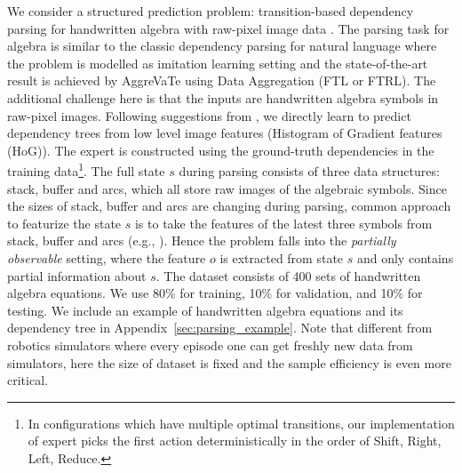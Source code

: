 \documentclass{article}
\begin{document}
We consider a structured prediction problem: transition-based dependency parsing for handwritten algebra with raw-pixel image data \cite{duyckpredicting}. The parsing task for algebra is similar to the classic dependency parsing for natural language \cite{chang2015learning_dependency} where the problem is modelled as imitation learning setting and the state-of-the-art result is achieved by AggreVaTe using Data Aggregation (FTL or FTRL). The additional challenge here is that the inputs are handwritten algebra symbols in raw-pixel images. Following suggestions from \cite{duyckpredicting}, we directly learn to predict dependency trees from low level image features (Histogram of Gradient features (HoG)). The expert is constructed using the ground-truth dependencies in the training data\footnote{In configurations which have multiple optimal transitions, our implementation of expert picks the first action deterministically in the order of Shift, Right, Left, Reduce.}. The full state $s$ during parsing consists of three data structures: stack, buffer and arcs, which all store raw images of the algebraic symbols. Since the sizes of stack, buffer and arcs are changing during parsing, common approach to featurize the state $s$ is to take the features of the latest three symbols from stack, buffer and arcs (e.g., \cite{chang2015learning_dependency}). Hence the problem falls into the \emph{partially observable} setting, where the feature $o$ is extracted from state $s$ and only contains partial information about $s$. %
The dataset consists of 400 sets of handwritten algebra equations. We use 80$\%$ for training, 10$\%$ for validation, and 10$\%$ for testing. We include an example of handwritten algebra equations and its dependency tree in Appendix~\ref{sec:parsing_example}. Note that different from robotics simulators where every episode one can get freshly new data from simulators, here the size of dataset is fixed and the sample efficiency is even more critical. 
\end{document}
